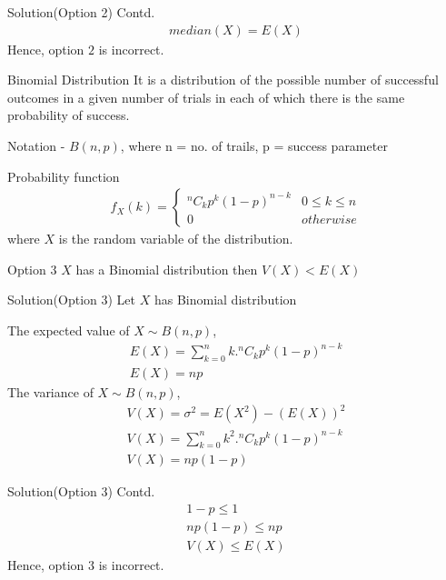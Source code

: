 \documentclass{beamer}
\begin{document}
\begin{frame}{Solution(Option 2) Contd.}
    \begin{align}
        median(X)=E(X)
    \end{align}
    Hence, option $2$ is incorrect.
\end{frame}
\begin{frame}{}
    \begin{block}{Binomial Distribution}
     It is a distribution of the possible number of successful outcomes in a given number of trials in each of which there is the same probability of success.
    
    Notation - $B(n,p)$, where n = no. of trails, p = success parameter
    \end{block}
    \begin{block}{Probability function}
    \begin{align}
        f_X(k)=
        \begin{cases}
            {^n C_k}p^k(1-p)^{n-k} & 0\leq k\leq n\\
            0 & otherwise
        \end{cases}
    \end{align}
    where $X$ is the random variable of the distribution.
    \end{block}
\end{frame}
\begin{frame}{Option 3}
     $X$ has a Binomial distribution then $V(X)<E(X)$
\end{frame}
\begin{frame}{Solution(Option 3)}
    Let $X$ has Binomial distribution
    
    The expected value of $X \sim B(n,p)$,
    \begin{align}
        E(X)=\sum\limits_{k=0}^{n}k.{^n C_k}p^k(1-p)^{n-k}\\
        E(X)=n p
    \end{align}
    The variance of $X \sim B(n,p)$,
    \begin{align}
        V(X)=\sigma^2=E(X^2)-(E(X))^2\\
        V(X)=\sum\limits_{k=0}^n k^2.{^n C_k}p^k(1-p)^{n-k}\\
        V(X)=n p(1-p)
    \end{align}
\end{frame}
\begin{frame}{Solution(Option 3) Contd.}
    \begin{align}
        1-p\leq1\\
        n p(1-p)\leq n p\\
        V(X)\leq E(X)
    \end{align}
    Hence, option $3$ is incorrect.
\end{frame}
\end{document}
